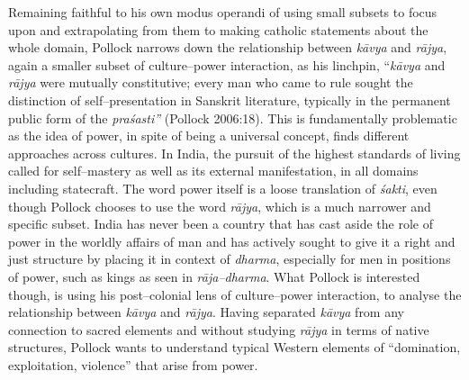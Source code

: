 Remaining faithful to his own modus operandi of using small subsets to focus upon and extrapolating from them to making catholic statements about the whole domain, Pollock narrows down the relationship between \textit{kāvya} and \textit{rājya}, again a smaller subset of culture–power interaction, as his linchpin, “\textit{kāvya} and \textit{rājya} were mutually constitutive; every man who came to rule sought the distinction of self–presentation in Sanskrit literature, typically in the permanent public form of the \textit{praśasti”} (Pollock 2006:18). This is fundamentally problematic as the idea of power, in spite of being a universal concept, finds different approaches across cultures. In India, the pursuit of the highest standards of living called for self–mastery as well as its external manifestation, in all domains including statecraft. The word power itself is a loose translation of \textit{śakti}, even though Pollock chooses to use the word \textit{rājya}, which is a much narrower and specific subset. India has never been a country that has cast aside the role of power in the worldly affairs of man and has actively sought to give it a right and just structure by placing it in context of \textit{dharma}, especially for men in positions of power, such as kings as seen in \textit{rāja–dharma}. What Pollock is interested though, is using his post–colonial lens of culture–power interaction, to analyse the relationship between \textit{kāvya} and \textit{rājya}. Having separated \textit{kāvya} from any connection to sacred elements and without studying \textit{rājya} in terms of native structures, Pollock wants to understand typical Western elements of “domination, exploitation, violence” that arise from power. 

